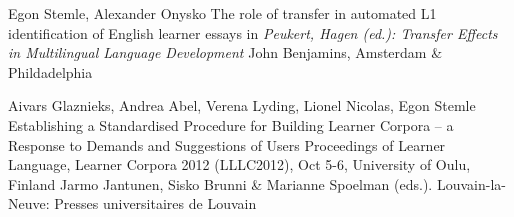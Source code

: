 \documentclass[11pt,a4paper]{moderncv}
\begin{document}
    



        {Egon Stemle, Alexander Onysko}
        {\small The role of transfer in automated L1 identification of English learner essays}
        {\small in \emph{Peukert, Hagen (ed.): Transfer Effects in Multilingual Language Development}}
        {\small John Benjamins, Amsterdam \& Phildadelphia}
        {}
    
        {Aivars Glaznieks, Andrea Abel, Verena Lyding, Lionel Nicolas, Egon
        Stemle}
        {\small Establishing a Standardised Procedure for Building Learner
        Corpora – a Response to Demands and Suggestions of Users}
        {\small Proceedings of Learner Language, Learner Corpora 2012
        (LLLC2012), Oct 5-6, University of Oulu, Finland}
        {\small Jarmo Jantunen, Sisko Brunni \&
        Marianne Spoelman (eds.). Louvain-la-Neuve: Presses universitaires de
        Louvain}
        {}
\end{document}
